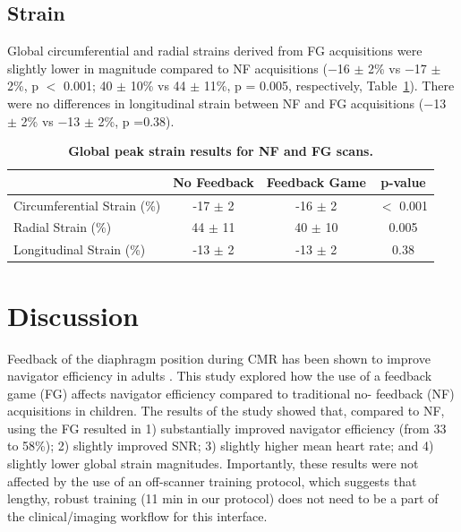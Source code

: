 \subsection{Strain}
	Global circumferential and radial strains derived from FG acquisitions were slightly lower in magnitude compared to NF acquisitions (−16 $\pm$ 2\% vs −17 $\pm$ 2\%, p $<$ 0.001; 40 $\pm$ 10\% vs 44 $\pm$ 11\%, p = 0.005, respectively, Table~\ref{table:FG_strains}). There were no differences in longitudinal strain between NF and FG acquisitions (−13 $\pm$ 2\% vs −13 $\pm$ 2\%, p =0.38).
	
	\begin{table}
		\centering
		\caption[Global peak strain results for NF and FG scans]{\textbf{Global peak strain results for NF and FG scans.}}
		\label{table:FG_strains}
		\begin{tabular}{cccc}
			\toprule
			\multicolumn{1}{l}{}                            & \multicolumn{1}{c}{No Feedback} & \multicolumn{1}{c}{Feedback Game} & \multicolumn{1}{c}{p-value} \\ \midrule
			\multicolumn{1}{l}{Circumferential Strain (\%)} & \multicolumn{1}{c}{-17 $\pm$ 2} & \multicolumn{1}{c}{-16 $\pm$ 2} & \multicolumn{1}{c}{$<$ 0.001} \\ 
			\multicolumn{1}{l}{Radial Strain (\%)}          & \multicolumn{1}{c}{44 $\pm$ 11} & \multicolumn{1}{c}{40 $\pm$ 10} & \multicolumn{1}{c}{0.005} \\
			\multicolumn{1}{l}{Longitudinal Strain (\%)}    & \multicolumn{1}{c}{-13 $\pm$ 2} & \multicolumn{1}{c}{-13 $\pm$ 2} & \multicolumn{1}{c}{0.38} \\
			\bottomrule                                                 
		\end{tabular}
	\end{table}

\section{Discussion}
	Feedback of the diaphragm position during CMR has been shown to improve navigator efficiency in adults \cite{Feuerlein2009,Jhooti2011}. This study explored how the use of a feedback game (FG) affects navigator efficiency compared to traditional no- feedback (NF) acquisitions in children. The results of the study showed that, compared to NF, using the FG resulted in 1) substantially improved navigator efficiency (from 33 to 58\%); 2) slightly improved SNR; 3) slightly higher mean heart rate; and 4) slightly lower global strain magnitudes. Importantly, these results were not affected by the use of an off-scanner training protocol, which suggests that lengthy, robust training (11 min in our protocol) does not need to be a part of the clinical/imaging workflow for this interface.

